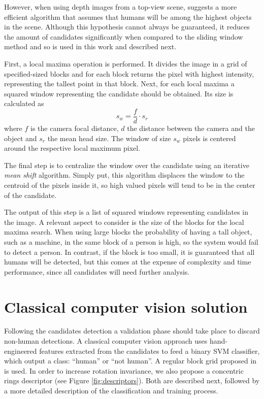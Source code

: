     However, when using depth images from a top-view scene, \cite{rauter} suggests a more efficient algorithm that assumes that humans will be among the highest objects in the scene. Although this hypothesis cannot always be guaranteed, it reduces the amount of candidates significantly when compared to the sliding window method and so is used in this work and described next.

    First, a local maxima operation is performed. It divides the image in a grid of specified-sized blocks and for each block returns the pixel with highest intensity, representing the tallest point in that block. Next, for each local maxima a squared window representing the candidate should be obtained. Its size is calculated as
    \begin{equation}
      s_w = \frac{f}{d} \cdot s_r
    \end{equation}
    where $f$ is the camera focal distance, $d$ the distance between the camera and the object and $s_r$ the mean head size. The window of size $s_w$ pixels is centered around the respective local maximum pixel.

    The final step is to centralize the window over the candidate using an iterative \textit{mean shift} algorithm. Simply put, this algorithm displaces the window to the centroid of the pixels inside it, so high valued pixels will tend to be in the center of the candidate.

    The output of this step is a list of squared windows representing candidates in the image. A relevant aspect to consider is the size of the blocks for the local maxima search. When using large blocks the probability of having a tall object, such as a machine, in the same block of a person is high, so the system would fail to detect a person. In contrast, if the block is too small, it is guaranteed that all humans will be detected, but this comes at the expense of complexity and time performance, since all candidates will need further analysis.

\section{Classical computer vision solution}
\label{sec:classical}

    Following the candidates detection a validation phase should take place to discard non-human detections. A classical computer vision approach \cite{rauter} uses hand-engineered features extracted from the candidates to feed a binary SVM classifier, which output a class: ``human'' or ``not human''. A regular block grid proposed in \cite{rauter} is used. In order to increase rotation invariance, we also propose a concentric rings descriptor (see Figure \ref{fig:descriptors}). Both are described next, followed by a more detailed description of the classification and training process.

